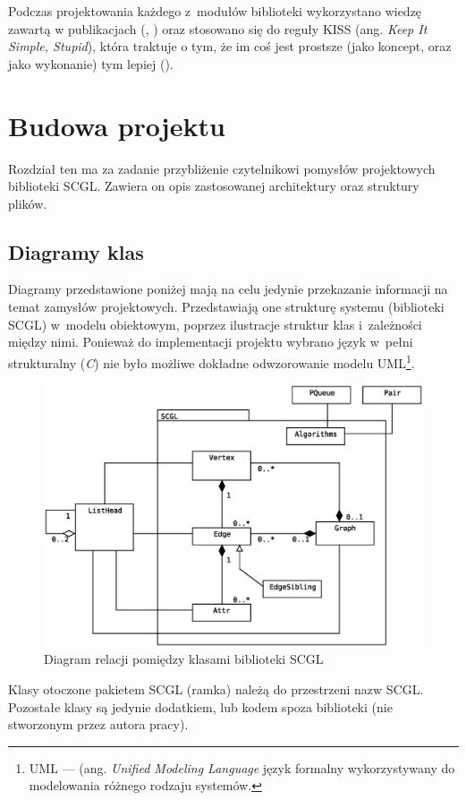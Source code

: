 \documentclass[a4paper,12pt,polish,oneside,openright]{thesis}
\begin{document}
Podczas projektowania każdego z~modułów biblioteki wykorzystano wiedzę zawartą w publikacjach (\cite{unix}, \cite{ansi}) oraz stosowano się do reguły KISS (ang. \emph{Keep It Simple, Stupid}), która traktuje o tym, że im coś jest prostsze (jako koncept, oraz jako wykonanie) tym lepiej (\cite{unix}).
\label{kiss}

\section{Budowa projektu}
Rozdział ten ma za zadanie przybliżenie czytelnikowi pomysłów projektowych biblioteki SCGL.
Zawiera on opis zastosowanej architektury oraz struktury plików.
\subsection{Diagramy klas}
Diagramy przedstawione poniżej mają na celu jedynie przekazanie informacji na temat zamysłów projektowych.
Przedstawiają one strukturę systemu (biblioteki SCGL) w~modelu obiektowym, poprzez ilustracje struktur klas i~zależności między nimi.
Ponieważ do implementacji projektu wybrano język w~pełni strukturalny (\emph{C}) nie było możliwe dokładne odwzorowanie modelu UML\footnote{UML --- (ang. \emph{Unified Modeling Language} język formalny wykorzystywany do modelowania różnego rodzaju systemów.}.

\begin{figure}[htb]
	\begin{center}
		\includegraphics[width=1.00\textwidth]{gfx/class_01.eps}
		\caption{Diagram relacji pomiędzy klasami biblioteki SCGL}
	\end{center}
\end{figure}
Klasy otoczone pakietem SCGL (ramka) należą do przestrzeni nazw SCGL.
Pozostałe klasy są jedynie dodatkiem, lub kodem spoza biblioteki (nie stworzonym przez autora pracy).
\end{document}
